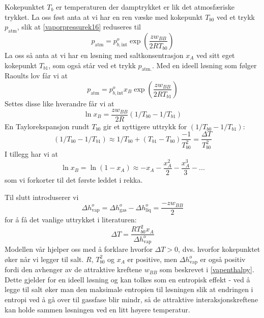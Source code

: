 Kokepunktet $T_b$ er temperaturen der damptrykket er lik det atmosfæriske trykket. La oss føst anta at vi har en ren væske med kokepunkt $T_{b0}$ ved et trykk $p_{\text{atm}}$, slik at \eqref{vaporpressurek16} reduseres til
\begin{equation}
	p_{\text{atm}}=p_{b,\text{int}}^o\exp\left(\frac{zw_{BB}}{2RT_{b0}}\right)
\end{equation}
La oss så anta at vi har en løsning med saltkonsentrasjon $x_A$ ved sitt eget kokepunkt $T_{b1}$, som også står ved et trykk $p_{\text{atm.}}$. Med en ideell løsning som følger Raoults lov får vi at \begin{equation}
	p_{\text{atm}}=p_{b,\text{int}}^ox_B\exp\left(\frac{zw_{BB}}{2RT_{b1}}\right)
\end{equation}
Settes disse like hverandre får vi at 
\begin{equation}
	\ln x_B=\frac{zw_{BB}}{2R}\left(1/T_{b0}-1/T_{b1}\right)
\end{equation}
En Taylorekspansjon rundt $T_{b0}$ gir et nyttigere uttrykk for $\left(1/T_{b0}-1/T_{b1}\right)$:
\begin{equation}
	\left(1/T_{b0}-1/T_{b1}\right)\approx1/T_{b0}+(T_{b1}-T_{b0})\frac{-1}{T_{b0}^2}=\frac{\Delta T}{T_{b0}^2}
\end{equation}
I tillegg har vi at 
\begin{equation}
	\ln x_B = \ln (1-x_A) \approx -x_A - \frac{x_A^2}{2} - \frac{x_A^3}{3} - ...
\end{equation}
som vi forkorter til det første leddet i rekka.

Til slutt introduserer vi
\begin{equation}
	\label{vapenthalpy}
	\Delta h_{\text{vap}}^o = \Delta h_{\text{gas}}^o - \Delta h_{\text{liq}}^o = \frac{-zw_{BB}}{2}
\end{equation}
for å få det vanlige uttrykket i literaturen:
\begin{equation}
	\Delta T = \frac{RT_{b0}^2x_A}{\Delta h_{\text{vap}}^o}
\end{equation}
Modellen vår hjelper oss med å forklare hvorfor $\Delta T>0$, dvs. hvorfor kokepunktet øker når vi legger til salt. $R$, $T_{b0}^2$ og $x_A$ er positive, men $\Delta h_{\text{vap}}^o$ er også positiv fordi den avhenger av de attraktive kreftene $w_{BB}$ som beskrevet i \eqref{vapenthalpy}. Dette gjelder for en ideell løsning og kan tolkes som en entropisk effekt - ved å legge til salt øker man den maksimale entropien til løsningen slik at endringen i entropi ved å gå over til gassfase blir mindr, så de attraktive interaksjonskreftene kan holde sammen løsningen ved en litt høyere temperatur.

